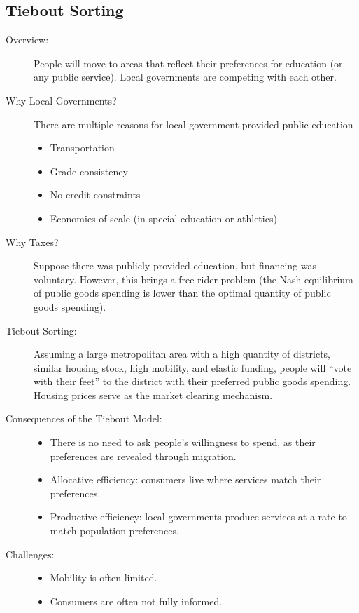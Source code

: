 \documentclass[10pt]{extarticle}
\begin{document}
  \subsection{Tiebout Sorting}%
  \begin{description}
    \item[Overview:] People will move to areas that reflect their preferences for education (or any public service). Local governments are competing with each other.
    \item[Why Local Governments?] There are multiple reasons for local government-provided public education
      \begin{itemize}
        \item Transportation
        \item Grade consistency
        \item No credit constraints
        \item Economies of scale (in special education or athletics)
      \end{itemize}
    \item[Why Taxes?] Suppose there was publicly provided education, but financing was voluntary. However, this brings a free-rider problem (the Nash equilibrium of public goods spending is lower than the optimal quantity of public goods spending).
    \item[Tiebout Sorting:] Assuming a large metropolitan area with a high quantity of districts, similar housing stock, high mobility, and elastic funding, people will ``vote with their feet'' to the district with their preferred public goods spending. Housing prices serve as the market clearing mechanism.
    \item[Consequences of the Tiebout Model:]\hfill
      \begin{itemize}
        \item There is no need to ask people's willingness to spend, as their preferences are revealed through migration.
        \item Allocative efficiency: consumers live where services match their preferences.
        \item Productive efficiency: local governments produce services at a rate to match population preferences.
      \end{itemize}
    \item[Challenges:]\hfill
      \begin{itemize}
        \item Mobility is often limited.
        \item Consumers are often not fully informed.

\end{itemize}
\end{description}
\end{document}
